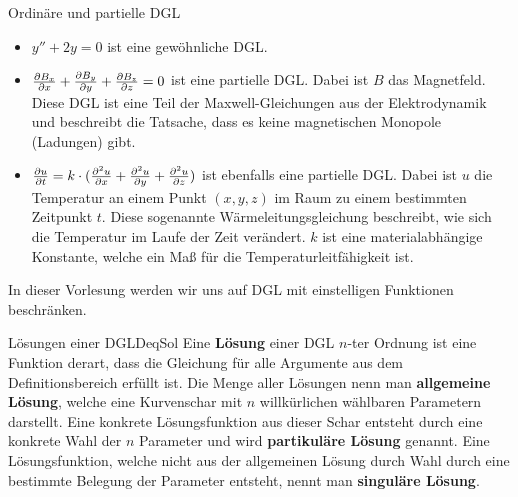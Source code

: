\begin{example}{Ordinäre und partielle DGL}{}
    \begin{itemize}
        \item $y''+2y=0$ ist eine gewöhnliche DGL.
        \item $\frac{\partial B_x}{\partial x} + \frac{\partial B_y}{\partial y} + \frac{\partial B_z}{\partial z} = 0$ ist eine partielle DGL. Dabei ist $B$ das Magnetfeld. Diese DGL ist eine Teil der Maxwell-Gleichungen aus der Elektrodynamik und beschreibt die Tatsache, dass es keine magnetischen Monopole (Ladungen) gibt.
        \item $\frac{\partial u}{\partial t} = k \cdot (\frac{\partial^{2} u}{\partial x} + \frac{\partial^{2} u}{\partial y} + \frac{\partial^{2} u}{\partial z})$ ist ebenfalls eine partielle DGL. Dabei ist $u$ die Temperatur an einem Punkt $(x,y,z)$ im Raum zu einem bestimmten Zeitpunkt $t$. Diese sogenannte Wärmeleitungsgleichung beschreibt, wie sich die Temperatur im Laufe der Zeit verändert. $k$ ist eine materialabhängige Konstante, welche ein Maß für die Temperaturleitfähigkeit ist.
    \end{itemize}
\end{example}

In dieser Vorlesung werden wir uns auf DGL mit einstelligen Funktionen beschränken.

\begin{definition}{Lösungen einer DGL}{DeqSol}
    Eine \textbf{Lösung} einer DGL $n$-ter Ordnung ist eine Funktion derart, dass die Gleichung für alle Argumente aus dem Definitionsbereich erfüllt ist. Die Menge aller Lösungen nenn man \textbf{allgemeine Lösung}, welche eine Kurvenschar mit $n$ willkürlichen wählbaren Parametern darstellt. Eine konkrete Lösungsfunktion aus dieser Schar entsteht durch eine konkrete Wahl der $n$ Parameter und wird \textbf{partikuläre Lösung} genannt. Eine Lösungsfunktion, welche nicht aus der allgemeinen Lösung durch Wahl durch eine bestimmte Belegung der Parameter entsteht, nennt man \textbf{singuläre Lösung}.
\end{definition}

